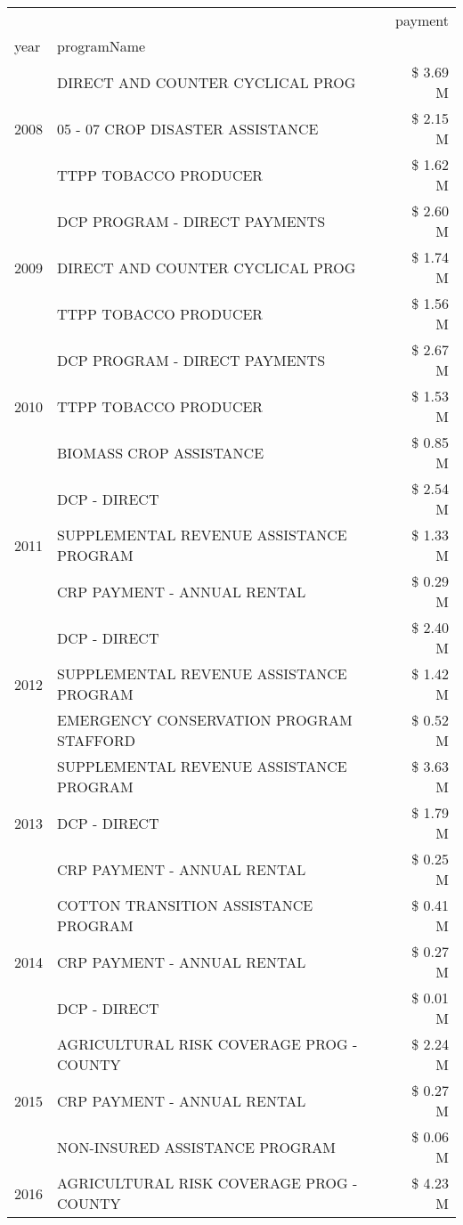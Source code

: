 \begin{tabular}{llr}
\toprule
 &  & payment \\
year & programName &  \\
\midrule
\multirow[t]{3}{*}{2008} & DIRECT AND COUNTER CYCLICAL PROG & \$ 3.69 M \\
 & 05 - 07 CROP DISASTER ASSISTANCE & \$ 2.15 M \\
 & TTPP TOBACCO PRODUCER & \$ 1.62 M \\
\cline{1-3}
\multirow[t]{3}{*}{2009} & DCP PROGRAM - DIRECT PAYMENTS & \$ 2.60 M \\
 & DIRECT AND COUNTER CYCLICAL PROG & \$ 1.74 M \\
 & TTPP TOBACCO PRODUCER & \$ 1.56 M \\
\cline{1-3}
\multirow[t]{3}{*}{2010} & DCP PROGRAM - DIRECT PAYMENTS & \$ 2.67 M \\
 & TTPP TOBACCO PRODUCER & \$ 1.53 M \\
 & BIOMASS CROP ASSISTANCE & \$ 0.85 M \\
\cline{1-3}
\multirow[t]{3}{*}{2011} & DCP - DIRECT & \$ 2.54 M \\
 & SUPPLEMENTAL REVENUE ASSISTANCE PROGRAM & \$ 1.33 M \\
 & CRP PAYMENT - ANNUAL RENTAL & \$ 0.29 M \\
\cline{1-3}
\multirow[t]{3}{*}{2012} & DCP - DIRECT & \$ 2.40 M \\
 & SUPPLEMENTAL REVENUE ASSISTANCE PROGRAM & \$ 1.42 M \\
 & EMERGENCY CONSERVATION PROGRAM STAFFORD & \$ 0.52 M \\
\cline{1-3}
\multirow[t]{3}{*}{2013} & SUPPLEMENTAL REVENUE ASSISTANCE PROGRAM & \$ 3.63 M \\
 & DCP - DIRECT & \$ 1.79 M \\
 & CRP PAYMENT - ANNUAL RENTAL & \$ 0.25 M \\
\cline{1-3}
\multirow[t]{3}{*}{2014} & COTTON TRANSITION ASSISTANCE PROGRAM & \$ 0.41 M \\
 & CRP PAYMENT - ANNUAL RENTAL & \$ 0.27 M \\
 & DCP - DIRECT & \$ 0.01 M \\
\cline{1-3}
\multirow[t]{3}{*}{2015} & AGRICULTURAL RISK COVERAGE PROG - COUNTY & \$ 2.24 M \\
 & CRP PAYMENT - ANNUAL RENTAL & \$ 0.27 M \\
 & NON-INSURED ASSISTANCE PROGRAM & \$ 0.06 M \\
\cline{1-3}
\multirow[t]{3}{*}{2016} & AGRICULTURAL RISK COVERAGE PROG - COUNTY & \$ 4.23 M \\

\end{tabular}
